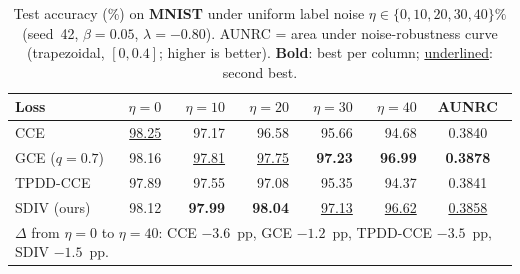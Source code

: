 \begin{table}[t]
\centering
\caption{Test accuracy (\%) on \textbf{MNIST} under uniform label noise
$\eta \in \{0,10,20,30,40\}\%$ (seed~42, $\beta{=}0.05$, $\lambda{=}{-0.80}$).
AUNRC = area under noise-robustness curve (trapezoidal, $[0,0.4]$; higher is
better). \textbf{Bold}: best per column; \underline{underlined}: second best.}
\label{tab:noise_mnist}
\footnotesize
\setlength{\tabcolsep}{4pt}
\begin{tabular}{@{}lrrrrrc@{}}
\toprule
\textbf{Loss} & $\eta{=}0$ & $\eta{=}10$ & $\eta{=}20$ & $\eta{=}30$ & $\eta{=}40$ & \textbf{AUNRC} \\
\midrule
CCE             & \underline{98.25} & 97.17              & 96.58              & 95.66              & 94.68              & 0.3840 \\
GCE ($q{=}0.7$) & 98.16            & \underline{97.81}  & \underline{97.75}  & \textbf{97.23}     & \textbf{96.99}     & \textbf{0.3878} \\
TPDD-CCE        & 97.89            & 97.55              & 97.08              & 95.35              & 94.37              & 0.3841 \\
SDIV (ours)     & 98.12            & \textbf{97.99}     & \textbf{98.04}     & \underline{97.13}  & \underline{96.62}  & \underline{0.3858} \\
\midrule
\multicolumn{7}{l}{\footnotesize
  $\Delta$ from $\eta{=}0$ to $\eta{=}40$: CCE $-3.6$~pp, GCE $-1.2$~pp,
  TPDD-CCE $-3.5$~pp, SDIV $-1.5$~pp.}\\
\bottomrule
\end{tabular}
\end{table}

